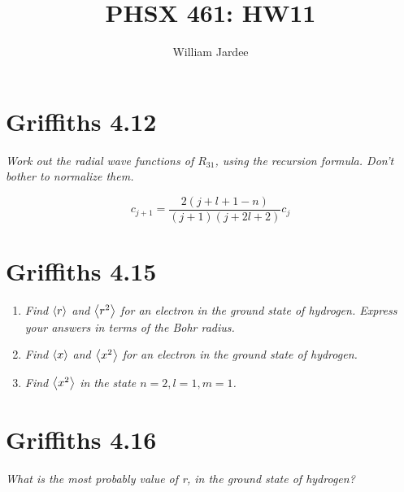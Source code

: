 \documentclass[12pt]{article}
\begin{document}
\title{PHSX 461: HW11}
\author{William Jardee}
\maketitle

\section*{Griffiths 4.12}
{\sl Work out the radial wave functions of $R_{31}$, using the recursion formula. Don't bother to normalize them.}

\begin{equation}
	\tag{Equation 4.76}
	c_{j+1} = \frac{2(j+l+1-n)}{(j+1)(j+2l+2)}c_j
	\label{eq:4.76}
\end{equation}

\section*{Griffiths 4.15}
\begin{enumerate}[label=\alph*)]
\item {\sl Find $\ev{r}$ and $\ev{r^2}$ for an electron in the ground state of hydrogen. Express your answers in terms of the Bohr radius.}

\item {\sl Find $\ev{x}$ and $\ev{x^2}$ for an electron in the ground state of hydrogen.}

\item {\sl Find $\ev{x^2}$ in the state $n=2, l=1, m=1$.}

\end{enumerate}

\section*{Griffiths 4.16}
{\sl What is the most probably value of r, in the ground state of hydrogen?}
\end{document}
